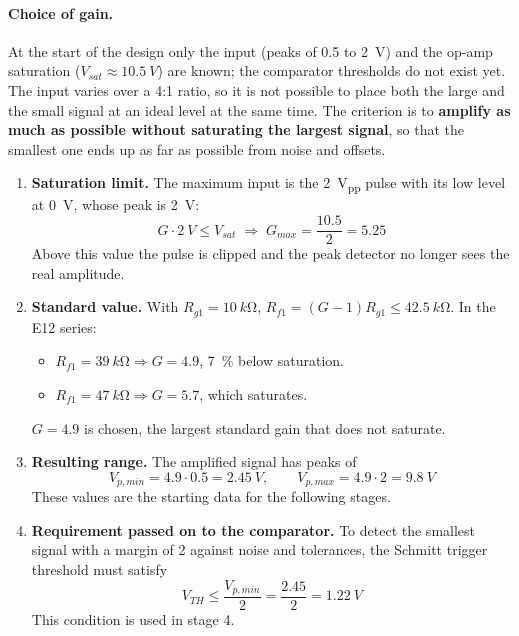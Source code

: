 \documentclass[11pt,letterpaper]{article}
\newcommand{\VTH}{V_{TH}}
\newcommand{\Vsat}{V_{sat}}
\begin{document}
\paragraph{Choice of gain.} At the start of the design only the input (peaks of 0.5 to \SI{2}{V}) and the op-amp saturation ($\Vsat\approx\SI{10.5}{V}$) are known; the comparator thresholds do not exist yet. The input varies over a 4:1 ratio, so it is not possible to place both the large and the small signal at an ideal level at the same time. The criterion is to \textbf{amplify as much as possible without saturating the largest signal}, so that the smallest one ends up as far as possible from noise and offsets.

\begin{enumerate}
  \item \textbf{Saturation limit.} The maximum input is the \SI{2}{V_{pp}} pulse with its low level at \SI{0}{V}, whose peak is \SI{2}{V}:
  \begin{equation}
  G\cdot\SI{2}{V}\le\Vsat\;\Rightarrow\;G_{max}=\frac{10.5}{2}=5.25
  \end{equation}
  Above this value the pulse is clipped and the peak detector no longer sees the real amplitude.
  \item \textbf{Standard value.} With $R_{g1}=\SI{10}{k\ohm}$, $R_{f1}=(G-1)R_{g1}\le\SI{42.5}{k\ohm}$. In the E12 series:
  \begin{itemize}
    \item $R_{f1}=\SI{39}{k\ohm}\Rightarrow G=4.9$, \SI{7}{\percent} below saturation.
    \item $R_{f1}=\SI{47}{k\ohm}\Rightarrow G=5.7$, which saturates.
  \end{itemize}
  $G=4.9$ is chosen, the largest standard gain that does not saturate.
  \item \textbf{Resulting range.} The amplified signal has peaks of
  \begin{equation}
  V_{p,min}=4.9\cdot0.5=\SI{2.45}{V},\qquad V_{p,max}=4.9\cdot2=\SI{9.8}{V}
  \end{equation}
  These values are the starting data for the following stages.
  \item \textbf{Requirement passed on to the comparator.} To detect the smallest signal with a margin of 2 against noise and tolerances, the Schmitt trigger threshold must satisfy
  \begin{equation}
  \VTH\le\frac{V_{p,min}}{2}=\frac{2.45}{2}=\SI{1.22}{V}
  \label{eq:vthmax}
  \end{equation}
  This condition is used in stage 4.
\end{enumerate}
\end{document}

